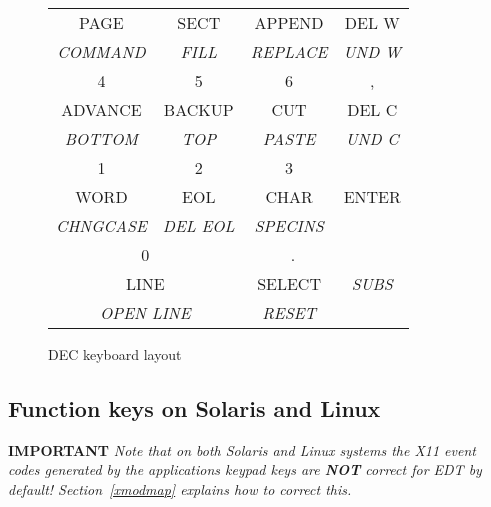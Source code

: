 \documentclass[twoside,11pt]{article}
\newcommand{\xlabel}[1]{}
\begin{document}
\begin{figure}[t]
\begin{center}
\begin{tabular}{|c|c|c|c|}
PAGE     & SECT      & APPEND  & DEL W \\
\textit{COMMAND}  & \textit{FILL}      & \textit{REPLACE}  & \textit{UND W} \\ \hline
4        & 5         & 6       & ,     \\
ADVANCE  & BACKUP    & CUT     & DEL C \\
\textit{BOTTOM}   & \textit{TOP}       & \textit{PASTE}   & \textit{UND C} \\ \hline
1        & 2         & 3       &       \\
WORD     & EOL       & CHAR    & ENTER \\
\textit{CHNGCASE} & \textit{DEL EOL}   & \textit{SPECINS} &       \\ \cline{1-3}
\multicolumn{2}{|c|}{0}         &~.       &       \\
\multicolumn{2}{|c|}{LINE}      & SELECT  & \textit{SUBS}  \\
\multicolumn{2}{|c|}{\textit{OPEN LINE}} & \textit{RESET}   &       \\ \hline
\end{tabular}
\end{center}
\caption{DEC keyboard layout}
\label{fig:dec-kb}
\normalsize
\end{figure}

\subsection{\xlabel{function_keys_on_solaris_and_linux}
Function keys on Solaris and Linux}
\label{function_keys_on_solaris_and_linux}

\textbf{IMPORTANT} \textit{Note that on both Solaris and Linux systems the
X11 event codes generated by the applications keypad keys are \textbf{NOT}
correct for EDT by default! Section~{\ref{xmodmap}} explains how
to correct this. }
\end{document}
